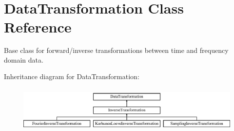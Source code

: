 \section{Data\+Transformation Class Reference}
\label{classPecos_1_1DataTransformation}


Base class for forward/inverse transformations between time and frequency domain data.  


Inheritance diagram for Data\+Transformation\+:\begin{figure}[H]
\begin{center}
\leavevmode
\includegraphics[height=2.372881cm]{classPecos_1_1DataTransformation}
\end{center}
\end{figure}
